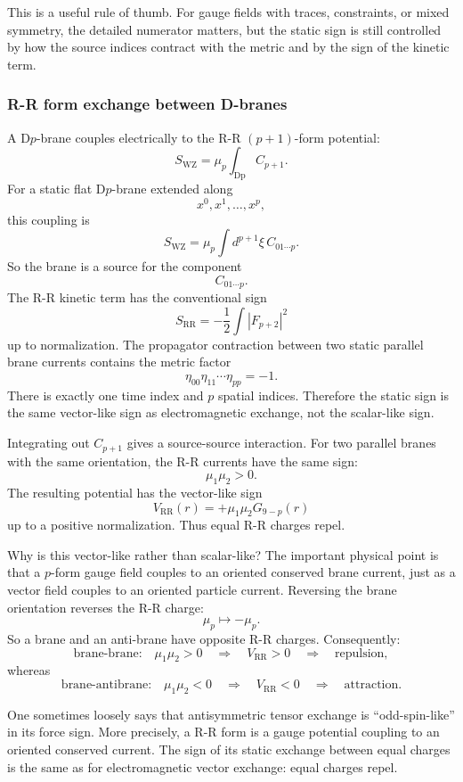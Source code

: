 \documentclass[
  10pt,
  a4paper,
  openany]{book}
\begin{document}
This is a useful rule of thumb. For gauge fields with traces,
constraints, or mixed symmetry, the detailed numerator matters, but the
static sign is still controlled by how the source indices contract with
the metric and by the sign of the kinetic term.

\subsubsection{R-R form exchange between
D-branes}\label{r-r-form-exchange-between-d-branes}

A D\(p\)-brane couples electrically to the R-R \((p+1)\)-form potential:
\[
S_{\mathrm{WZ}}
=
\mu_p
\int_{\mathrm{Dp}} C_{p+1}.
\] For a static flat D\(p\)-brane extended along \[
x^0,x^1,\dots,x^p,
\] this coupling is \[
S_{\mathrm{WZ}}
=
\mu_p
\int d^{p+1}\xi\,
C_{0 1\cdots p}.
\] So the brane is a source for the component \[
C_{0 1\cdots p}.
\] The R-R kinetic term has the conventional sign \[
S_{\mathrm{RR}}
=
-\frac{1}{2}
\int |F_{p+2}|^2
\] up to normalization. The propagator contraction between two static
parallel brane currents contains the metric factor \[
\eta_{00}\eta_{11}\cdots\eta_{pp}
=
-1.
\] There is exactly one time index and \(p\) spatial indices. Therefore
the static sign is the same vector-like sign as electromagnetic
exchange, not the scalar-like sign.

Integrating out \(C_{p+1}\) gives a source-source interaction. For two
parallel branes with the same orientation, the R-R currents have the
same sign: \[
\mu_1\mu_2>0.
\] The resulting potential has the vector-like sign \[
V_{\mathrm{RR}}(r)
=
+\mu_1\mu_2G_{9-p}(r)
\] up to a positive normalization. Thus equal R-R charges repel.

Why is this vector-like rather than scalar-like? The important physical
point is that a \(p\)-form gauge field couples to an oriented conserved
brane current, just as a vector field couples to an oriented particle
current. Reversing the brane orientation reverses the R-R charge: \[
\mu_p\mapsto-\mu_p.
\] So a brane and an anti-brane have opposite R-R charges. Consequently:
\[
\text{brane-brane:}\quad \mu_1\mu_2>0
\quad\Longrightarrow\quad
V_{\mathrm{RR}}>0
\quad\Longrightarrow\quad
\text{repulsion},
\] whereas \[
\text{brane-antibrane:}\quad \mu_1\mu_2<0
\quad\Longrightarrow\quad
V_{\mathrm{RR}}<0
\quad\Longrightarrow\quad
\text{attraction}.
\]

One sometimes loosely says that antisymmetric tensor exchange is
``odd-spin-like'' in its force sign. More precisely, a R-R form is a
gauge potential coupling to an oriented conserved current. The sign of
its static exchange between equal charges is the same as for
electromagnetic vector exchange: equal charges repel.
\end{document}
